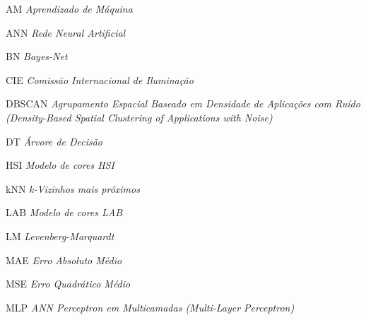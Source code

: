 \begin{siglas}


\item[{AM}] \emph{Aprendizado de Máquina}


\item[{ANN}] \emph{Rede Neural Artificial}
\item[{BN}] \emph{Bayes-Net}


\item[{CIE}] \emph{Comissão Internacional de Iluminação}


\item[{DBSCAN}] \emph{Agrupamento Espacial Baseado em Densidade de Aplicações com Ruído (Density-Based Spatial Clustering of Applications with Noise)}

\item[{DT}]  \emph{Árvore de Decisão}
\item[{HSI}] \emph{Modelo de cores HSI}


\item[{kNN}] \emph{k-Vizinhos mais próximos}
\item[{LAB}] \emph{Modelo de cores LAB}
\item[{LM}] \emph{Levenberg-Marquardt}


\item[{MAE}] \emph{Erro Absoluto Médio}


\item[{MSE}] \emph{Erro Quadrático Médio}
\item[{MLP}] \emph{ANN Perceptron em Multicamadas (Multi-Layer Perceptron)}


\end{siglas}
